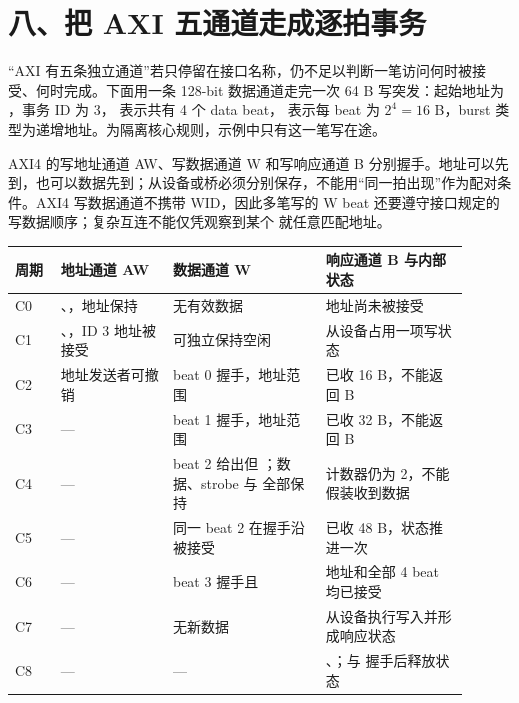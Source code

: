\section{八、把 AXI 五通道走成逐拍事务}

“AXI 有五条独立通道”若只停留在接口名称，仍不足以判断一笔访问何时被接受、何时完成。下面用一条 128-bit 数据通道走完一次 64 B 写突发：起始地址为 ，事务 ID 为 3， 表示共有 4 个 data beat， 表示每 beat 为 $2^4=16$ B，burst 类型为递增地址。为隔离核心规则，示例中只有这一笔写在途。

AXI4 的写地址通道 AW、写数据通道 W 和写响应通道 B 分别握手。地址可以先到，也可以数据先到；从设备或桥必须分别保存，不能用“同一拍出现”作为配对条件。AXI4 写数据通道不携带 WID，因此多笔写的 W beat 还要遵守接口规定的写数据顺序；复杂互连不能仅凭观察到某个  就任意匹配地址。


\begin{longtable}{L{0.09\linewidth}L{0.22\linewidth}L{0.30\linewidth}L{0.29\linewidth}}
\toprule
周期 & 地址通道 AW & 数据通道 W & 响应通道 B 与内部状态 \\
\midrule
C0 & 、，地址保持 & 无有效数据 & 地址尚未被接受 \\\tablerowrule
C1 & 、，ID 3 地址被接受 & 可独立保持空闲 & 从设备占用一项写状态 \\\tablerowrule
C2 & 地址发送者可撤销  & beat 0 握手，地址范围  & 已收 16 B，不能返回 B \\\tablerowrule
C3 & --- & beat 1 握手，地址范围  & 已收 32 B，不能返回 B \\\tablerowrule
C4 & --- & beat 2 给出但 ；数据、strobe 与  全部保持 & 计数器仍为 2，不能假装收到数据 \\\tablerowrule
C5 & --- & 同一 beat 2 在握手沿被接受 & 已收 48 B，状态推进一次 \\\tablerowrule
C6 & --- & beat 3 握手且  & 地址和全部 4 beat 均已接受 \\\tablerowrule
C7 & --- & 无新数据 & 从设备执行写入并形成响应状态 \\\tablerowrule
C8 & --- & --- & 、；与  握手后释放状态 \\
\bottomrule
\end{longtable}

